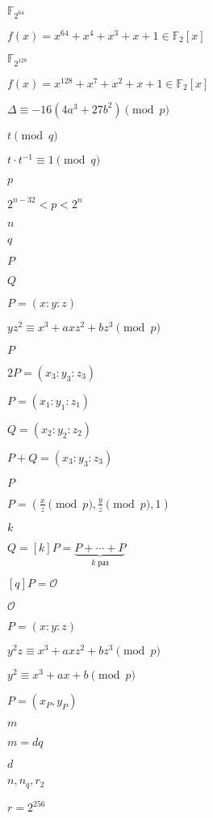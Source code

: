 \documentclass{article}
\begin{document}
$ \mathbb F_{2^{64}}$
\pagebreak

$ f(x) = x^{64} + x^4 + x^3 + x + 1 \in \mathbb F_2[x]$
\pagebreak

$ \mathbb F_{2^{128}}$
\pagebreak

$ f(x) = x^{128} + x^7 + x^2 + x + 1 \in \mathbb F_2[x]$
\pagebreak

$\Delta \equiv -16(4a^3 + 27b^2) \pmod{p} $
\pagebreak

$ t \pmod{q} $
\pagebreak

$ t \cdot t^{-1} \equiv 1 \pmod{q}$
\pagebreak

$ p $
\pagebreak

$ 2^{n-32} < p < 2^n $
\pagebreak

$ n $
\pagebreak

$ q $
\pagebreak

$ P $
\pagebreak

$ Q $
\pagebreak

$ P = (x:y:z) $
\pagebreak

$ yz^2 \equiv x^3 + axz^2 + bz^3 \pmod{p}$
\pagebreak

$P$
\pagebreak

$ 2P = (x_3:y_3:z_3)$
\pagebreak

$ P = (x_1: y_1: z_1) $
\pagebreak

$ Q = (x_2:y_2:z_2)$
\pagebreak

$ P+Q = (x_3:y_3:z_3)$
\pagebreak

$ P$
\pagebreak

$ P = \left( \frac{x}{z} \pmod{p}, \frac{y}{z} \pmod{p}, 1\right) $
\pagebreak

$ k $
\pagebreak

$ Q = [k]P = \underbrace{P+ \cdots + P}_{k\text{~раз}}$
\pagebreak

$ [q]P = \mathcal O$
\pagebreak

$ \mathcal O $
\pagebreak

$ P=(x:y:z) $
\pagebreak

$ y^2z \equiv x^3 + axz^2 + bz^3 \pmod{p} $
\pagebreak

$ y^2 \equiv x^3 + ax + b \pmod{p} $
\pagebreak

$P=(x_P, y_P)$
\pagebreak

$ m $
\pagebreak

$ m = dq $
\pagebreak

$ d $
\pagebreak

$ n, n_q, r_2$
\pagebreak

$ r = 2^{256}$
\pagebreak
\end{document}
